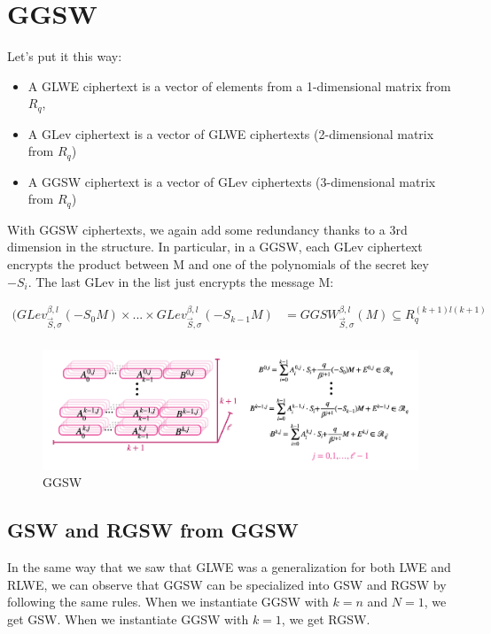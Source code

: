 \documentclass{techrep}
\theoremstyle{definition}
\theoremstyle{plain}
\begin{document}
\section{GGSW}

Let’s put it this way:
\begin{itemize}
  \item A GLWE ciphertext is a vector of elements from a 1-dimensional matrix from $R_q$,
  \item A GLev ciphertext is a vector of GLWE ciphertexts (2-dimensional matrix from $R_q$)
  \item A GGSW ciphertext is a vector of GLev ciphertexts (3-dimensional matrix from $R_q$)
\end{itemize}

With GGSW ciphertexts, we again add some redundancy thanks to a 3rd dimension in the structure. In particular, in a GGSW, each GLev ciphertext encrypts the  product between 
 M and one of the polynomials of the secret key $-S_i$. The last GLev in the list just encrypts the message M:

	\begin{align*}
(GLev_{\overrightarrow{S},\sigma}^{\beta, l}(-S_0 M) \times ... \times GLev_{\overrightarrow{S},\sigma}^{\beta, l}(-S_{k-1} M)	&=	{GGSW}_{\overrightarrow{S}, \sigma}^{\beta, l}(M)  \subseteq  R_{q}^{{(k+1)}l{(k+1)}}  \\
	\end{align*}


	\begin{figure}[H]
		\centering
		\includegraphics[width=.9\columnwidth]{fig/GGSW_1.png}
		\caption{GGSW}
		\label{fig:GGSW}
	\end{figure}

\subsection{GSW and RGSW from GGSW }
In the same way that we saw that GLWE was a generalization for both LWE and RLWE, we can observe that GGSW can be specialized into GSW and RGSW by following the same rules. When we instantiate GGSW with $k = n$ and $N = 1$, we get GSW.  When we instantiate GGSW with $k = 1$, we get RGSW.
\end{document}
